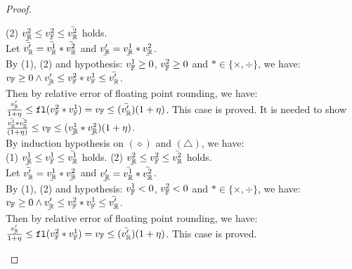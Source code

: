 \documentclass[a4paper,11pt]{article}
\begin{document}
\begin{proof}
\begin{itemize}
	(2) $\ubar{\rval^2} \leq \fval^2 \leq \bar{\rval^2}$ holds.\\
	Let $\bar{v_{\mathbb{R}}'} = 
	\bar{v_{\mathbb{R}}^1} * \bar{v_{\mathbb{R}}^2}$ and 
	$\ubar{\rval'} = \ubar{\rval^1} * \ubar{\rval^2}$.
	\\
	By (1), (2) and hypothesis: $v_{\mathbb{F}}^1 \geq 0$, $v_{\mathbb{F}}^2 \geq 0$ and $* \in \{\times, \div\}$, we have:
	$\fval \geq 0
	\land
	\ubar{\rval'}
	\leq \fval^2 \bop \fval^1
	\leq \bar{\rval'}$.\\
	Then by relative error of floating point rounding, we have:\\
	$\frac{\ubar{\rval'}}{1 + \eta}
	\leq \floaten(\fval^2 \bop \fval^1) = \fval
	\leq (\bar{\rval'})(1 + \eta)$.
	This case is proved.
	\caseL{\[
		\inferrule*[right = bop-nn]
		{
			\trsenv, \expr_1 \trsto (\fval^1, (\ubar{\rval^1}, \bar{\rval^1}))
			~~~~
			\trsenv, \expr_2 \trsto (\fval^2, (\ubar{\rval^2}, \bar{\rval^2}))
			~~~~
			\fval^1 < 0
			~~~~
			\fval^2 < 0
			~~~~
			\fval = \floaten(\fval^1 * \fval^2)
			~~~~
			* \in \{\times, \div \}
		}
		{
		    \trsenv, \expr_1 * \expr_2
		    \trsto
		    \big(
		    \fval,
		    (\frac{\bar{\rval^1} * \bar{\rval^2}}{(1 + \eta)}, 
		        (\ubar{\rval^1} * \ubar{\rval^2})(1 + \eta))
		    \big)
		}
	\]}
	It is needed to show 
	$\frac{\bar{\rval^1} * \bar{\rval^2}}{(1 + \eta)}
	\leq \fval \leq 
	(\ubar{\rval^1} * \ubar{\rval^2})(1 + \eta)$.\\
	By induction hypothesis on $(\diamond)$ and $(\triangle)$, we have:\\
	(1) $\ubar{\rval^1} \leq \fval^1 \leq \bar{\rval^1}$ holds. 
	(2) $\ubar{\rval^2} \leq \fval^2 \leq \bar{\rval^2}$ holds.\\
	Let $\bar{\rval'} = 
	\ubar{\rval^1} * \ubar{\rval^2}$ and 
	$\ubar{\rval'} = \bar{\rval^1} * \bar{\rval^2}$.
	\\
	By (1), (2) and hypothesis: $v_{\mathbb{F}}^1 < 0$, $v_{\mathbb{F}}^2 < 0$ and $* \in \{\times, \div\}$, we have:
	$\fval \geq 0
	\land
	\ubar{\rval'}
	\leq \fval^2 \bop \fval^1
	\leq \bar{\rval'}$.\\
	Then by relative error of floating point rounding, we have:\\
	$\frac{\ubar{\rval'}}{1 + \eta}
	\leq \floaten(\fval^2 \bop \fval^1) = \fval
	\leq (\bar{\rval'})(1 + \eta)$.
	This case is proved.
\end{itemize}
\end{proof}
\end{document}
